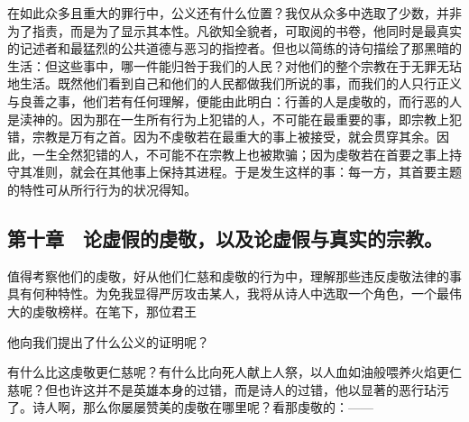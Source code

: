 在如此众多且重大的罪行中，公义还有什么位置？我仅从众多中选取了少数，并非为了指责，而是为了显示其本性。凡欲知全貌者，可取阅的书卷，他同时是最真实的记述者和最猛烈的公共道德与恶习的指控者。但也以简练的诗句描绘了那黑暗的生活：但这些事中，哪一件能归咎于我们的人民？对他们的整个宗教在于无罪无玷地生活。既然他们看到自己和他们的人民都做我们所说的事，而我们的人只行正义与良善之事，他们若有任何理解，便能由此明白：行善的人是虔敬的，而行恶的人是渎神的。因为那在一生所有行为上犯错的人，不可能在最重要的事，即宗教上犯错，宗教是万有之首。因为不虔敬若在最重大的事上被接受，就会贯穿其余。因此，一生全然犯错的人，不可能不在宗教上也被欺骗；因为虔敬若在首要之事上持守其准则，就会在其他事上保持其进程。于是发生这样的事：每一方，其首要主题的特性可从所行行为的状况得知。\par


\subsection{第十章　论虚假的虔敬，以及论虚假与真实的宗教。}

值得考察他们的虔敬，好从他们仁慈和虔敬的行为中，理解那些违反虔敬法律的事具有何种特性。为免我显得严厉攻击某人，我将从诗人中选取一个角色，一个最伟大的虔敬榜样。在笔下，那位君王\par

\par

他向我们提出了什么公义的证明呢？\par

\par

有什么比这虔敬更仁慈呢？有什么比向死人献上人祭，以人血如油般喂养火焰更仁慈呢？但也许这并不是英雄本身的过错，而是诗人的过错，他以显著的恶行玷污了。诗人啊，那么你屡屡赞美的虔敬在哪里呢？看那虔敬的：——\par

